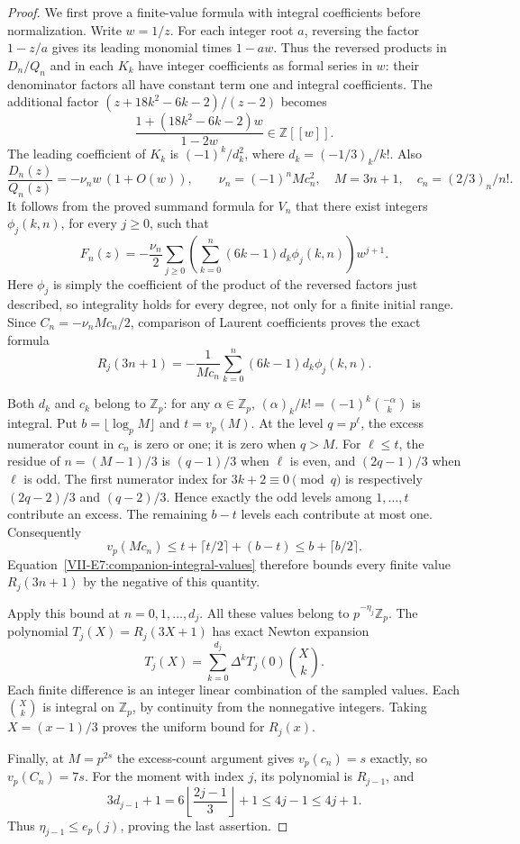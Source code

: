 \documentclass[11pt,letterpaper]{article}
\numberwithin{equation}{section}
\begin{document}
\begin{proof}
We first prove a finite-value formula with integral coefficients before
normalization. Write $w=1/z$. For each integer root $a$, reversing the
factor $1-z/a$ gives its leading monomial times $1-aw$.
Thus the reversed products in $D_n/Q_n$ and in each $K_k$ have integer
coefficients as formal series in $w$: their denominator factors all have
constant term one and integral coefficients. The additional factor
$(z+18k^2-6k-2)/(z-2)$ becomes
\[
 \frac{1+(18k^2-6k-2)w}{1-2w}\in\mathbb Z[[w]].
\]
The leading coefficient of $K_k$ is $(-1)^k/d_k^2$, where
$d_k=(-1/3)_k/k!$. Also
\[
 \frac{D_n(z)}{Q_n(z)}
 =-\nu_nw\,(1+O(w)),\qquad
 \nu_n=(-1)^nM c_n^2,
 \quad M=3n+1,\quad c_n=(2/3)_n/n!.
\]
It follows from the proved summand formula for $V_n$ that there exist
integers $\phi_j(k,n)$, for every $j\ge0$, such that
\[
 F_n(z)=-\frac{\nu_n}{2}\sum_{j\ge0}
 \left(\sum_{k=0}^n(6k-1)d_k\phi_j(k,n)\right)w^{j+1}.
\]
Here $\phi_j$ is simply the coefficient of the product of the reversed
factors just described, so integrality holds for every degree, not only
for a finite initial range. Since $C_n=-\nu_n M c_n/2$, comparison of
Laurent coefficients proves the exact formula
\begin{equation}\label{VII-E7:companion-integral-values}
 R_j(3n+1)=-\frac1{M c_n}
 \sum_{k=0}^n(6k-1)d_k\phi_j(k,n).
\end{equation}

Both $d_k$ and $c_k$ belong to $\mathbb Z_p$: for any
$\alpha\in\mathbb Z_p$, $(\alpha)_k/k!=(-1)^k\binom{-\alpha}{k}$
is integral. Put $b=\lfloor\log_p M\rfloor$ and $t=v_p(M)$.
At the level $q=p^\ell$, the excess numerator count in $c_n$
is zero or one; it is zero when $q>M$.
For $\ell\le t$, the residue of $n=(M-1)/3$ is
$(q-1)/3$ when $\ell$ is even, and $(2q-1)/3$ when $\ell$ is odd.
The first numerator index for $3k+2\equiv0\pmod q$ is respectively
$(2q-2)/3$ and $(q-2)/3$. Hence exactly the odd levels among
$1,\ldots,t$ contribute an excess. The remaining $b-t$ levels each
contribute at most one. Consequently
\[
 v_p(Mc_n)\le t+\lceil t/2\rceil+(b-t)
 \le b+\lceil b/2\rceil.
\]
Equation~\eqref{VII-E7:companion-integral-values} therefore bounds every
finite value $R_j(3n+1)$ by the negative of this quantity.

Apply this bound at $n=0,1,\ldots,d_j$. All these values belong to
$p^{-\eta_j}\mathbb Z_p$. The polynomial $T_j(X)=R_j(3X+1)$ has
exact Newton expansion
\[
 T_j(X)=\sum_{k=0}^{d_j}\Delta^kT_j(0)\binom Xk.
\]
Each finite difference is an integer linear combination of the sampled
values. Each $\binom Xk$ is integral on $\mathbb Z_p$, by continuity
from the nonnegative integers. Taking $X=(x-1)/3$ proves the uniform
bound for $R_j(x)$.

Finally, at $M=p^{2s}$ the excess-count argument gives
$v_p(c_n)=s$ exactly, so $v_p(C_n)=7s$.
For the moment with index $j$, its polynomial is $R_{j-1}$, and
\[
 3d_{j-1}+1
 =6\left\lfloor\frac{2j-1}{3}\right\rfloor+1
 \le4j-1\le4j+1.
\]
Thus $\eta_{j-1}\le e_p(j)$, proving the last assertion.
\end{proof}
\end{document}
